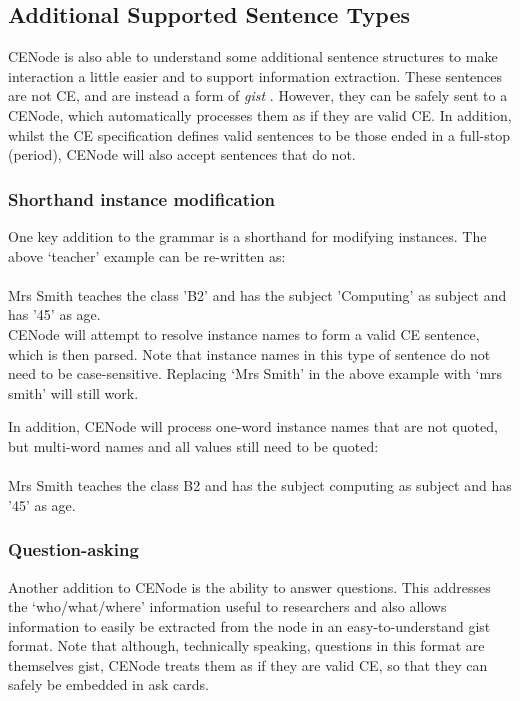 \documentclass{scrartcl}
\newcommand{\ce}[1]{\textsf{#1}}
\begin{document}
\subsection{Additional Supported Sentence Types}
CENode is also able to understand some additional sentence structures to make interaction a little easier and to support information extraction. These sentences are not CE, and are instead a form of \textit{gist} \cite{preece14hmc}. However, they can be safely sent to a CENode, which automatically processes them as if they are valid CE. In addition, whilst the CE specification defines valid sentences to be those ended in a full-stop (period), CENode will also accept sentences that do not.


\subsubsection{Shorthand instance modification}

One key addition to the grammar is a shorthand for modifying instances. The above `teacher' example can be re-written as:\\
\\\ce{Mrs Smith teaches the class 'B2' and has the subject 'Computing' as subject and has '45' as age.}\\

CENode will attempt to resolve instance names to form a valid CE sentence, which is then parsed. Note that instance names in this type of sentence do not need to be case-sensitive. Replacing `Mrs Smith' in the above example with `mrs smith' will still work.

In addition, CENode will process one-word instance names that are not quoted, but multi-word names and all values still need to be quoted:\\
\\\ce{Mrs Smith teaches the class B2 and has the subject computing as subject and has '45' as age.}

\subsubsection{Question-asking}
\label{questions}

Another addition to CENode is the ability to answer questions. This addresses the `who/what/where' information useful to researchers and also allows information to easily be extracted from the node in an easy-to-understand gist format. Note that although, technically speaking, questions in this format are themselves gist, CENode treats them as if they are valid CE, so that they can safely be embedded in \ce{ask card}s.
\end{document}
